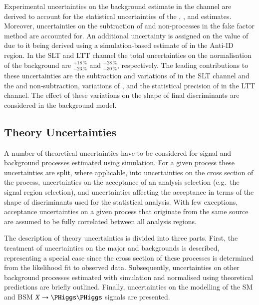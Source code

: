 Experimental uncertainties on the \faketauhadvis background estimate
in the \lephad channel are derived to account for the statistical
uncertainties of the \FFqcd, \FFttbar, and \rqcd estimates. Moreover,
uncertainties on the subtraction of \ttbar and non-\ttbar processes in
the fake factor method are accounted for. An additional uncertainty is
assigned on the value of \rqcd due to it being derived using a
simulation-based estimate of \ttbarFakes in the Anti-ID region. In the
\lephad SLT and LTT channel the total uncertainties on the
normalisation of the \faketauhadvis background are
$^{+18\,\%}_{-23\,\%}$ and $^{+28\,\%}_{-30\,\%}$, respectively. The
leading contributions to these uncertainties are the \ttbar
subtraction and variations of \rqcd in the SLT channel and the \ttbar
and non-\ttbar subtraction, variations of \rqcd, and the statistical
precision of \FFttbar in the LTT channel. The effect of these
variations on the shape of final discriminants are considered in the
background model.


\subsection{Theory Uncertainties}%
\label{sec:modelling_uncertainties}%
\label{sec:theory_uncertainties}

A number of theoretical uncertainties have to be considered for signal
and background processes estimated using simulation. For a given
process these uncertainties are split, where applicable, into
uncertainties on the cross section of the process, uncertainties on
the acceptance of an analysis selection (e.g.\ the signal region
selection), and uncertainties affecting the acceptance in terms of the
shape of discriminants used for the statistical analysis. With few
exceptions, acceptance uncertainties on a given process that originate
from the same source are assumed to be fully correlated between all
analysis regions.

The description of theory uncertainties is divided into three parts.
First, the treatment of uncertainties on the major \ZHF and \ttbar
backgrounds is described, representing a special case since the cross
section of these processes is determined from the likelihood fit to
observed data. Subsequently, uncertainties on other background
processes estimated with simulation and normalised using theoretical
predictions are briefly outlined. Finally, uncertainties on the
modelling of the SM \HH and BSM $X \to \HH$ signals are presented.

